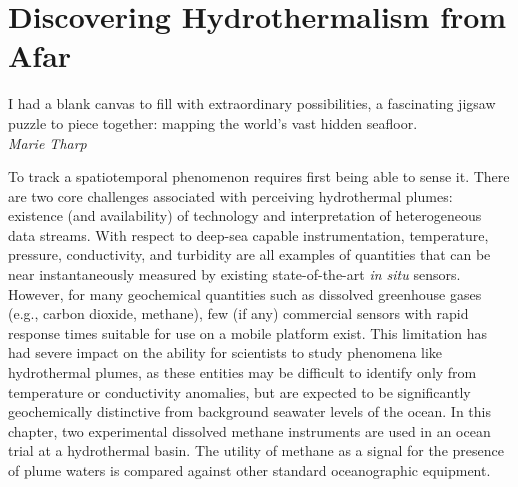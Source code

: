 \chapter{Discovering Hydrothermalism from Afar}
\label{chap:afar}

\begin{center}
    \begin{minipage}{0.7\textwidth}
      \begin{small}
      I had a blank canvas to fill with extraordinary possibilities, a fascinating jigsaw puzzle to piece together: mapping the world's vast hidden seafloor.\\ \emph{Marie Tharp}
      \end{small}
    \end{minipage}
    \vspace{0.5cm}
\end{center}

To track a spatiotemporal phenomenon requires first being able to sense it. There are two core challenges associated with perceiving hydrothermal plumes: existence (and availability) of technology and interpretation of heterogeneous data streams. With respect to deep-sea capable instrumentation, temperature, pressure, conductivity, and turbidity are all examples of quantities that can be near instantaneously measured by existing state-of-the-art \emph{in situ} sensors. However, for many geochemical quantities such as dissolved greenhouse gases (e.g., carbon dioxide, methane), few (if any) commercial sensors with rapid response times suitable for use on a mobile platform exist. This limitation has had severe impact on the ability for scientists to study phenomena like hydrothermal plumes, as these entities may be difficult to identify only from temperature or conductivity anomalies, but are expected to be significantly geochemically distinctive from background seawater levels of the ocean\autocite{scholz2019shelf,jakuba2007stochastic}. In this chapter, two experimental dissolved methane instruments are used in an ocean trial at a hydrothermal basin. The utility of methane as a signal for the presence of plume waters is compared against other standard oceanographic equipment.

